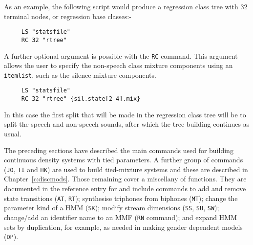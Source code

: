 As an example, the following  script would produce a 
regression class tree with 32 terminal nodes, or regression base
classes:-
\begin{verbatim}
     LS "statsfile"
     RC 32 "rtree"
\end{verbatim}

A further optional argument is possible with the 
\texttt{RC} command. 
This argument allows the user to specify the non-speech class
mixture components using an \texttt{itemlist}, 
such as the silence mixture components. 
\begin{verbatim}
     LS "statsfile"
     RC 32 "rtree" {sil.state[2-4].mix}
\end{verbatim}
In this case the first split that will be made in the regression class tree
will be to split the speech and non-speech sounds, after which the
tree building continues as usual. 


The preceding sections have described the main  commands used for
building continuous density systems with tied parameters.  A further group
of commands (\texttt{JO}, \texttt{TI} and \texttt{HK}) are used to build
tied-mixture systems and these are described in Chapter~\ref{c:discmods}.
Those
remaining cover a miscellany of functions.  They are documented in the
reference entry for  and include commands to add and remove
state transitions 
(\texttt{AT},
\texttt{RT}); synthesise triphones from
biphones (\texttt{MT}); 
change the parameter kind of a HMM (\texttt{SK});
modify stream dimensions (\texttt{SS},
\texttt{SU},
\texttt{SW}); change/add an identifier name
to an MMF (\texttt{RN} command); and expand
HMM sets by duplication, for example, as needed in making gender
dependent models (\texttt{DP}).


